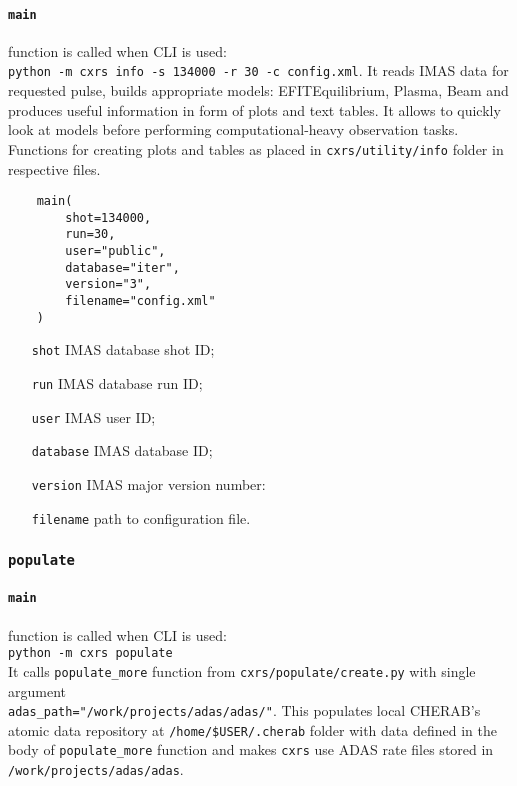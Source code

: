 \documentclass[../../main]{subfiles}
\begin{document}
\paragraph{\texttt{main}} function is called when CLI is used:\\
\texttt{python -m cxrs info -s 134000 -r 30 -c config.xml}.
It reads IMAS data for requested pulse, builds appropriate models: EFITEquilibrium, Plasma, Beam and produces useful information in form of plots and text tables. It allows to quickly look at models before performing computational-heavy observation tasks.
Functions for creating plots and tables as placed in \texttt{cxrs/utility/info} folder in respective files.

\begin{verbatim}
    main(
        shot=134000,
        run=30,
        user="public",
        database="iter",
        version="3",
        filename="config.xml"
    )
\end{verbatim}

\begin{itemize}[align=left]
    \item[\texttt{shot}] IMAS database shot ID;
    \item[\texttt{run}] IMAS database run ID;
    \item[\texttt{user}] IMAS user ID;
    \item[\texttt{database}] IMAS database ID;
    \item[\texttt{version}] IMAS major version number:
    \item[\texttt{filename}] path to configuration file.
\end{itemize}

\subsubsection{\texttt{populate}}

\paragraph{\texttt{main}} function is called when CLI is used:\\
\texttt{python -m cxrs populate}\\
It calls \texttt{populate\_more} function from \texttt{cxrs/populate/create.py} with single argument \\ \texttt{adas\_path="/work/projects/adas/adas/"}. This populates local CHERAB's atomic data repository at \texttt{/home/\$USER/.cherab} folder with data defined in the body of \texttt{populate\_more} function and makes \texttt{cxrs} use ADAS rate files stored in \texttt{/work/projects/adas/adas}.
\end{document}
